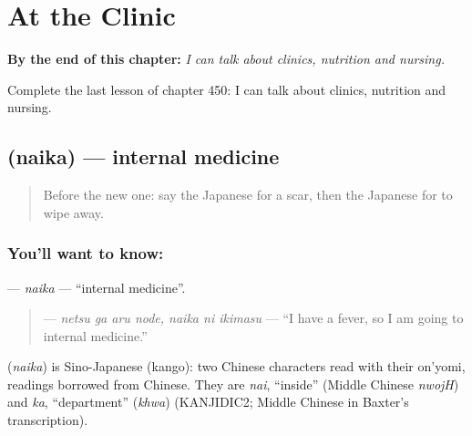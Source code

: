 
\chapter{At the Clinic}
\label{ch:ja-at-the-clinic}

\begin{chapteropening}
\textbf{By the end of this chapter:} \emph{I can talk about clinics, nutrition and nursing.}

Complete the last lesson of chapter 450: I can talk about clinics, nutrition and nursing.
\end{chapteropening}

\section[\texorpdfstring{\ja{ないか} (naika)}{ないか (naika)}]{ (naika) — internal medicine}

\label{lesson:JA-C450-naika}



\begin{quote}
Before the new one: say the Japanese for a scar, then the Japanese for to wipe away.
\end{quote}

\subsection*{You'll want to know: }
\textbf{} — \emph{naika} — \textquotedblleft{}internal medicine\textquotedblright{}.

\begin{quote}
\textbf{  } — \emph{netsu ga aru node, naika ni ikimasu} — \textquotedblleft{}I have a fever, so I am going to internal medicine.\textquotedblright{}
\end{quote}

\begin{cousinweb}
\textbf{} (\emph{naika}) is Sino-Japanese (kango): two Chinese characters read with their on'yomi, readings borrowed from Chinese. They are \emph{nai}, \textquotedblleft{}inside\textquotedblright{} (Middle Chinese \emph{nwojH}) and \emph{ka}, \textquotedblleft{}department\textquotedblright{} (\emph{khwa}) (KANJIDIC2; Middle Chinese in Baxter's transcription).
\end{cousinweb}

